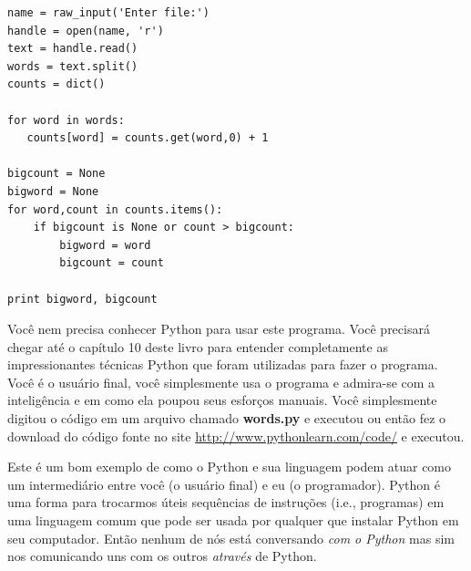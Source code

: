 \beforeverb
\begin{verbatim}
name = raw_input('Enter file:')
handle = open(name, 'r')
text = handle.read()
words = text.split()
counts = dict()

for word in words:
   counts[word] = counts.get(word,0) + 1

bigcount = None
bigword = None
for word,count in counts.items():
    if bigcount is None or count > bigcount:
        bigword = word
        bigcount = count

print bigword, bigcount
\end{verbatim}
\afterverb

%
%
%

Você nem precisa conhecer Python para usar este programa. Você precisará chegar até o
capítulo 10 deste livro para entender completamente as impressionantes técnicas Python
que foram utilizadas para fazer o programa. Você é o usuário final, você simplesmente usa
o programa e admira-se com a inteligência e em como ela poupou seus esforços manuais.
Você simplesmente digitou o código em um arquivo chamado {\bf words.py} e executou ou então
fez o download do código fonte no site \url{http://www.pythonlearn.com/code/} e executou.
%


Este é um bom exemplo de como o Python e sua linguagem podem atuar como um intermediário
entre você (o usuário final) e eu (o programador). Python é uma forma para trocarmos úteis
sequências de instruções (i.e., programas) em uma linguagem comum que pode ser usada por 
qualquer que instalar Python em seu computador. Então nenhum de nós está conversando {\em com o Python}
mas sim nos comunicando uns com os outros {\em através} de Python.
%

